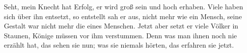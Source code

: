 \lettrine[lines=3]{S}{}eht, mein Knecht hat Erfolg, er wird groß sein und hoch erhaben. Viele haben sich über ihn entsetzt, so entstellt sah er aus, nicht mehr wie ein Mensch, seine Gestalt war nicht mehr die eines Menschen. Jetzt aber setzt er viele Völker in Staunen, Könige müssen vor ihm verstummen. Denn was man ihnen noch nie erzählt hat, das sehen sie nun; was sie niemals hörten, das erfahren sie jetzt.
